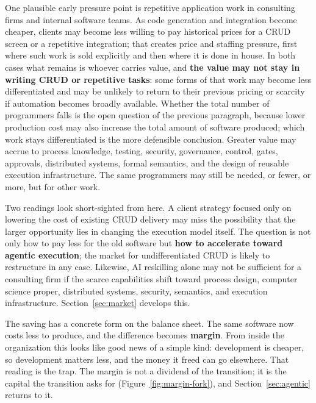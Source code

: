 \documentclass[10pt,oneside,openany]{book}
\begin{document}
\begin{notebox}
One plausible early pressure point is repetitive application work in consulting firms and internal software teams. As code generation and integration become cheaper, clients may become less willing to pay historical prices for a CRUD screen or a repetitive integration; that creates price and staffing pressure, first where such work is sold explicitly and then where it is done in house. In both cases what remains is whoever carries value, and \textbf{the value may not stay in writing CRUD or repetitive tasks}: some forms of that work may become less differentiated and may be unlikely to return to their previous pricing or scarcity if automation becomes broadly available. Whether the total number of programmers falls is the open question of the previous paragraph, because lower production cost may also increase the total amount of software produced; which work stays differentiated is the more defensible conclusion. Greater value may accrue to process knowledge, testing, security, governance, control, gates, approvals, distributed systems, formal semantics, and the design of reusable execution infrastructure. The same programmers may still be needed, or fewer, or more, but for other work.

Two readings look short-sighted from here. A client strategy focused only on lowering the cost of existing CRUD delivery may miss the possibility that the larger opportunity lies in changing the execution model itself. The question is not only how to pay less for the old software but \textbf{how to accelerate toward agentic execution}; the market for undifferentiated CRUD is likely to restructure in any case. Likewise, AI reskilling alone may not be sufficient for a consulting firm if the scarce capabilities shift toward process design, computer science proper, distributed systems, security, semantics, and execution infrastructure. Section~\ref{sec:market} develops this.
\end{notebox}

The saving has a concrete form on the balance sheet. The same software now costs less to produce, and the difference becomes \textbf{margin}. From inside the organization this looks like good news of a simple kind: development is cheaper, so development matters less, and the money it freed can go elsewhere. That reading is the trap. The margin is not a dividend of the transition; it is the capital the transition asks for (Figure~\ref{fig:margin-fork}), and Section~\ref{sec:agentic} returns to it.
\end{document}
